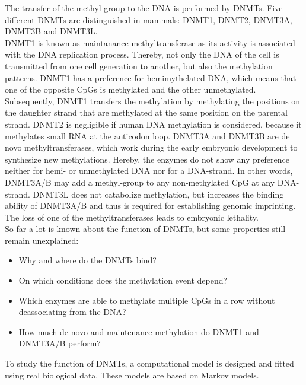 The transfer of the methyl group to the DNA is performed by \acp{DNMT}. Five different \acp{DNMT} are distinguished in mammals: DNMT1, DNMT2, DNMT3A, DNMT3B and DNMT3L.\cite{DNAMethylation}\\
DNMT1 is known as maintanance methyltransferase as its activity is associated with the DNA replication process. Thereby, not only the DNA of the cell is transmitted from one cell generation to another, but also the methylation patterns. DNMT1 has a preference for hemimythelated DNA, which means that one of the opposite \acp{CpG} is methylated and the other unmethylated. Subsequently, DNMT1 transfers the methylation by methylating the positions on the daughter strand that are methylated at the same position on the parental strand.\cite{DNAMethylation}\newline
DNMT2 is negligible if human DNA methylation is considered, because it methylates small RNA at the anticodon loop.\cite{DNMT2}\newline
DNMT3A and DNMT3B are de novo methyltransferases, which work during the early embryonic development to synthesize new methylations. Hereby, the enzymes do not show any preference neither for hemi- or unmethylated DNA nor for a DNA-strand. In other words, DNMT3A/B may add a methyl-group to any non-methylated \ac{CpG} at any DNA-strand. DNMT3L does not catabolize methylation, but increases the binding ability of DNMT3A/B and thus is required for establishing genomic imprinting.\cite{DNAMethylation}\newline
The loss of one of the methyltransferases leads to embryonic lethality.\cite{DNAMethylation}\\

So far a lot is known about the function of \acp{DNMT}, but some properties still remain unexplained:
\begin{itemize}
\item Why and where do the \acp{DNMT} bind?
\item On which conditions does the methylation event depend?
\item Which enzymes are able to methylate multiple \acp{CpG} in a row without deassociating from the DNA?
\item How much de novo and maintenance methylation do DNMT1 and DNMT3A/B perform?
\end{itemize}

To study the function of \acp{DNMT}, a computational model is designed and fitted using real biological data. These models are based on Markov models.

